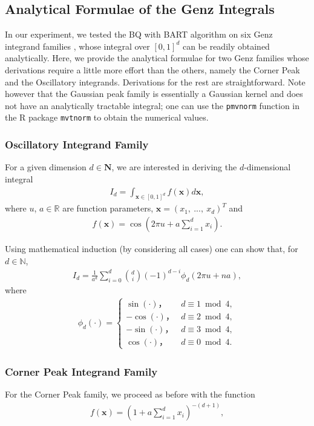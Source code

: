 \subsection*{Analytical Formulae of the Genz Integrals}
In our experiment, we tested the BQ with BART algorithm on six Genz integrand families \cite{Genz}, whose integral over $[0, 1]^{d}$ can be readily obtained analytically. Here, we provide the analytical formulae for two Genz families whose derivations require a little more effort than the others, namely the Corner Peak and the Oscillatory integrands. Derivations for the rest are straightforward. Note however that the Gaussian peak family is essentially a Gaussian kernel and does not have an analytically tractable integral; one can use the \texttt{pmvnorm} function in the R package \texttt{mvtnorm} to obtain the numerical values.

\subsubsection*{Oscillatory Integrand Family}
For a given dimension $d \in \pmb{N}$, we are interested in deriving the $d$-dimensional integral 
\begin{align}
    I_d = \int_{\pmb{x} \in [0, 1]^{d}} f(\pmb{x}) d\pmb{x} , 
\end{align}
where $u$, $a \in \mathbb{R}$ are function parameters, $\pmb{x} = (x_1, \ ..., \ x_d)^{T}$ and 
\begin{align}
    f(\mathbf{x}) = \cos(2\pi u + a\sum_{i = 1}^{d}x_{i}).
\end{align}

Using mathematical induction (by considering all cases) one can show that, for $d \in \mathbb{N}$, 
\begin{align}
    I_{d} = \frac{1}{a^{d}} \sum_{i = 0}^{d} {d \choose i} (-1)^{d - i} \phi_d(2\pi u + na) ,
\end{align}
where 
\begin{align}
    \phi_d(\cdot) 
    =
    \begin{cases}
    \sin(\cdot) ， & d \equiv 1 \bmod 4 ,\\
    -\cos(\cdot) ， & d \equiv 2 \bmod 4 ,\\
    -\sin(\cdot) ， & d \equiv 3 \bmod 4 ,\\
    \cos(\cdot) ， & d \equiv 0 \bmod 4 .
    \end{cases}
\end{align}

\subsubsection*{Corner Peak Integrand Family}
For the Corner Peak family, we proceed as before with the function
\begin{align}
    f(\mathbf{x}) = \left( 1 + a\sum_{i=1}^{d}x_{i} \right)^{-(d + 1)} ,
\end{align}

